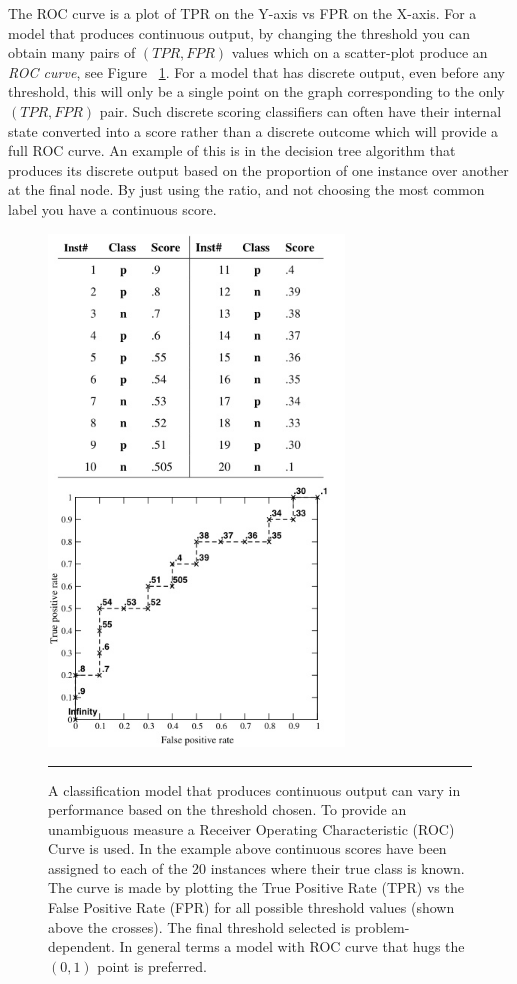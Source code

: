 The ROC curve is a plot of TPR on the Y-axis vs FPR on the X-axis.
For a model that produces continuous output, by changing the threshold you can obtain many pairs of $(TPR, FPR)$ values which on a scatter-plot produce an \textit{ROC curve}, see Figure ~\ref{fig:ROC_curve_2}.
For a model that has discrete output, even before any threshold, this will only be a single point on the graph corresponding to the only $(TPR, FPR)$ pair.
Such discrete scoring classifiers can often have their internal state converted into a score rather than a discrete outcome which will provide a full ROC curve.
An example of this is in the decision tree algorithm that produces its discrete output based on the proportion of one instance over another at the final node.
By just using the ratio, and not choosing the most common label you have a continuous score.
\begin{figure}[htbp]
	\centering
		\includegraphics[width = 0.7\textwidth]{./Figures/ROC_curve.jpg}
		\rule{35em}{0.5pt}
	\caption[The ROC Curve]{A classification model that produces continuous output can vary in performance based on the threshold chosen. To provide an unambiguous measure a Receiver Operating Characteristic (ROC) Curve is used. In the example above continuous scores have been assigned to each of the 20 instances where their true class is known. The curve is made by plotting the True Positive Rate (TPR) vs the False Positive Rate (FPR) for all possible threshold values (shown above the crosses). The final threshold selected is problem-dependent. In general terms a model with ROC curve that hugs the $(0,1)$ point is preferred.}
	\label{fig:ROC_curve_2}
\end{figure}

